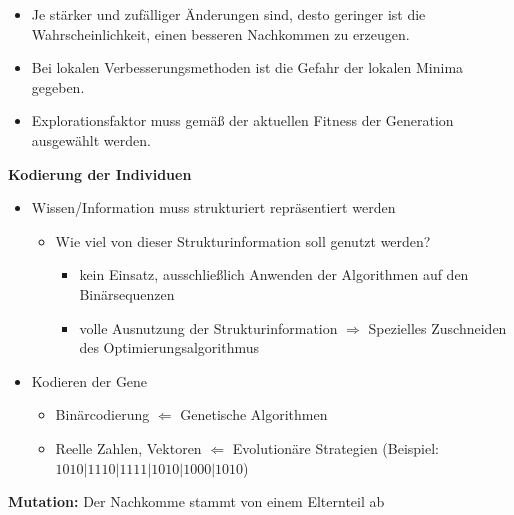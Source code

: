 \begin{itemize}
	\item Je stärker und zufälliger Änderungen sind, desto geringer ist die Wahrscheinlichkeit, einen besseren Nachkommen zu erzeugen.
	\item Bei lokalen Verbesserungsmethoden ist die Gefahr der lokalen Minima gegeben.
	\item Explorationsfaktor muss gemäß der aktuellen Fitness der Generation ausgewählt werden.
\end{itemize}
%
\textbf{Kodierung der Individuen}
\begin{itemize}
	\item Wissen/Information muss strukturiert repräsentiert werden
	\begin{itemize}
		\item Wie viel von dieser Strukturinformation soll genutzt werden?
		\begin{itemize}
			\item kein Einsatz, ausschließlich Anwenden der Algorithmen auf den Binärsequenzen
			\item volle Ausnutzung der Strukturinformation $\Rightarrow$ Spezielles Zuschneiden des Optimierungsalgorithmus
		\end{itemize}
	\end{itemize}
	\item Kodieren der Gene
	\begin{itemize}
		\item Binärcodierung $\Leftarrow$ Genetische Algorithmen
		\item Reelle Zahlen, Vektoren $\Leftarrow$ Evolutionäre Strategien (Beispiel: $1010|1110|1111|1010|1000|1010$)
	\end{itemize}
\end{itemize}
%
\textbf{Mutation:} Der Nachkomme stammt von einem Elternteil ab
